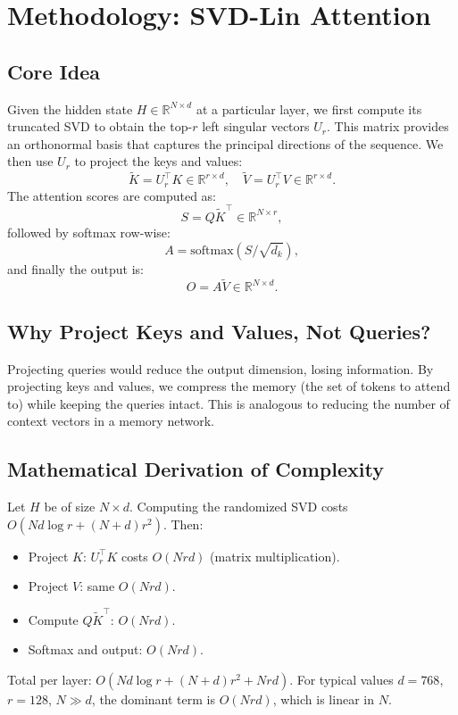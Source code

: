 \section{Methodology: SVD-Lin Attention}
\subsection{Core Idea}
Given the hidden state $H \in \mathbb{R}^{N \times d}$ at a particular layer, we first compute its truncated SVD to obtain the top-$r$ left singular vectors $U_r$. This matrix provides an orthonormal basis that captures the principal directions of the sequence. We then use $U_r$ to project the keys and values:
\[
\tilde{K} = U_r^\top K \in \mathbb{R}^{r \times d}, \quad
\tilde{V} = U_r^\top V \in \mathbb{R}^{r \times d}.
\]
The attention scores are computed as:
\[
S = Q \tilde{K}^\top \in \mathbb{R}^{N \times r},
\]
followed by softmax row-wise:
\[
A = \text{softmax}(S / \sqrt{d_k}),
\]
and finally the output is:
\[
O = A \tilde{V} \in \mathbb{R}^{N \times d}.
\]

\subsection{Why Project Keys and Values, Not Queries?}
Projecting queries would reduce the output dimension, losing information. By projecting keys and values, we compress the memory (the set of tokens to attend to) while keeping the queries intact. This is analogous to reducing the number of context vectors in a memory network.

\subsection{Mathematical Derivation of Complexity}
Let $H$ be of size $N \times d$. Computing the randomized SVD costs $O(N d \log r + (N+d) r^2)$. Then:
\begin{itemize}
    \item Project $K$: $U_r^\top K$ costs $O(N r d)$ (matrix multiplication).
    \item Project $V$: same $O(N r d)$.
    \item Compute $Q \tilde{K}^\top$: $O(N r d)$.
    \item Softmax and output: $O(N r d)$.
\end{itemize}
Total per layer: $O(N d \log r + (N+d) r^2 + N r d)$. For typical values $d=768$, $r=128$, $N \gg d$, the dominant term is $O(N r d)$, which is linear in $N$.

